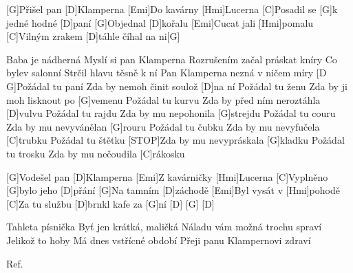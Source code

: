 
[G]Přišel pan [D]Klamperna
[Emi]Do kavárny [Hmi]Lucerna
[C]Posadil se [G]k jedné hodné [D]paní
[G]Objednal [D]kořalu
[Emi]Cucat jali [Hmi]pomalu
[C]Vilným zrakem [D]táhle číhal na ni[G]

Baba je nádherná
Myslí si pan Klamperna
Rozrušením začal práskat kníry
Co bylev salonní
Strčil hlavu těsně k ní
Pan Klamperna nezná v ničem míry
[D G]Požádal tu paní
Zda by nemoh činit soulož [D]na ní
Požádal tu ženu
Zda by ji moh lisknout po [G]vemenu
Požádal tu kurvu
Zda by před ním neroztáhla [D]vulvu
Požádal tu rajdu
Zda by mu nepohonila [G]strejdu
\slpc
[C]Požádal tu couru
Zda by mu nevyvánělan [G]rouru
Požádal tu čubku
Zda by mu nevyfučela [C]trubku
Požádal tu štětku
[STOP]Zda by mu nevypráskala [G]kladku
Požádal tu trosku
Zda by mu nečoudila [C]rákosku

[G]Vodešel pan [D]Klamperna
[Emi]Z kavárničky [Hmi]Lucerna
[C]Vyplněno [G]bylo jeho [D]přání
[G]Na tamním [D]záchodě
[Emi]Byl vysát v [Hmi]pohodě
[C]Za tu službu [D]brnkl kafe za [G]ní
[D] [G] [D]

Tahleta písnička
Byť jen krátká, maličká
Náladu vám možná trochu spraví
Jelikož to hoby
Má dnes vstřícné období
Přeji panu Klampernovi zdraví

Ref.
